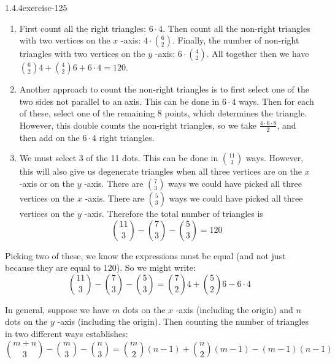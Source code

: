 \documentclass[twoside,11pt,]{book}
\numberwithin{equation}{chapter}
\begin{document}
\begin{divisionsolution}{1.4.4}{}{exercise-125}
\begin{enumerate}[label=(\alph*)]
\begin{equation*}
{7 \choose 2}4 + {5 \choose 2}6 - 6\cdot 4 = 120
\end{equation*}
%
\item\hypertarget{li-1313}{}\hypertarget{p-2097}{}%
First count all the right triangles: \(6 \cdot 4\). Then count all the non-right triangles with two vertices on the \(x\) -axis: \(4 \cdot {6 \choose 2}\). Finally, the number of non-right triangles with two vertices on the \(y\) -axis: \(6 \cdot {4 \choose 2}\). All together then we have \({6 \choose 2}4 + {4 \choose 2}6 + 6 \cdot 4 = 120\).%
\item\hypertarget{li-1314}{}\hypertarget{p-2098}{}%
Another approach to count the non-right triangles is to first select one of the two sides not parallel to an axis. This can be done in \(6 \cdot 4\) ways. Then for each of these, select one of the remaining 8 points, which determines the triangle. However, this double counts the non-right triangles, so we take \(\frac{4\cdot 6 \cdot 8}{2}\), and then add on the \(6\cdot 4\) right triangles.%
\item\hypertarget{li-1315}{}\hypertarget{p-2099}{}%
We must select 3 of the 11 dots. This can be done in \({11 \choose 3}\) ways. However, this will also give us degenerate triangles when all three vertices are on the \(x\) -axis or on the \(y\) -axis. There are \({7 \choose 3}\) ways we could have picked all three vertices on the \(x\) -axis. There are \({5 \choose 3}\) ways we could have picked all three vertices on the \(y\) -axis. Therefore the total number of triangles is%
\begin{equation*}
{11 \choose 3} - {7 \choose 3} - {5 \choose 3} = 120
\end{equation*}
%
\end{enumerate}
%
\par
\hypertarget{p-2100}{}%
Picking two of these, we know the expressions must be equal (and not just because they are equal to 120). So we might write:%
\begin{equation*}
{11 \choose 3} - {7 \choose 3} - {5 \choose 3} = {7 \choose 2}4 + {5 \choose 2}6 - 6\cdot 4
\end{equation*}
%
\par
\hypertarget{p-2101}{}%
In general, suppose we have \(m\) dots on the \(x\) -axis (including the origin) and \(n\) dots on the \(y\) -axis (including the origin). Then counting the number of triangles in two different ways establishes:%
\begin{equation*}
{m+n \choose 3} - {m \choose 3} - {n \choose 3} = {m \choose 2}(n-1) + {n \choose 2}(m-1) - (m-1)(n-1)
\end{equation*}
%
\end{divisionsolution}%
\end{document}
